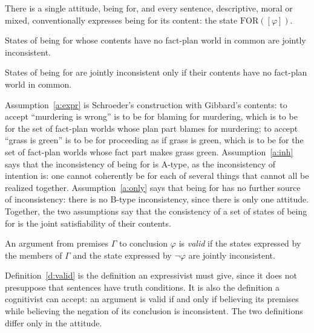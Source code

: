 \documentclass{situationist-preprint}
\begin{document}
\begin{assumption}[Expression]\label{a:expr}
There is a single attitude, being for, and every sentence, descriptive, moral or mixed, conventionally expresses being for its content: the state $\mathrm{FOR}([\varphi])$.
\end{assumption}

\begin{assumption}[Inheritance]\label{a:inh}
States of being for whose contents have no fact-plan world in common are jointly inconsistent.
\end{assumption}

\begin{assumption}\label{a:only}
States of being for are jointly inconsistent only if their contents have no fact-plan world in common.
\end{assumption}

Assumption~\ref{a:expr} is Schroeder's construction with Gibbard's contents: to accept \enquote{murdering is wrong} is to be for blaming for murdering, which is to be for the set of fact-plan worlds whose plan part blames for murdering; to accept \enquote{grass is green} is to be for proceeding as if grass is green, which is to be for the set of fact-plan worlds whose fact part makes grass green. Assumption~\ref{a:inh} says that the inconsistency of being for is A-type, as the inconsistency of intention is: one cannot coherently be for each of several things that cannot all be realized together. Assumption~\ref{a:only} says that being for has no further source of inconsistency: there is no B-type inconsistency, since there is only one attitude. Together, the two assumptions say that the consistency of a set of states of being for is the joint satisfiability of their contents.

\begin{definition}[Validity]\label{d:valid}
An argument from premises $\Gamma$ to conclusion $\varphi$ is \emph{valid} if the states expressed by the members of $\Gamma$ and the state expressed by $\neg\varphi$ are jointly inconsistent.
\end{definition}

Definition~\ref{d:valid} is the definition an expressivist must give, since it does not presuppose that sentences have truth conditions. It is also the definition a cognitivist can accept: an argument is valid if and only if believing its premises while believing the negation of its conclusion is inconsistent. The two definitions differ only in the attitude.
\end{document}
